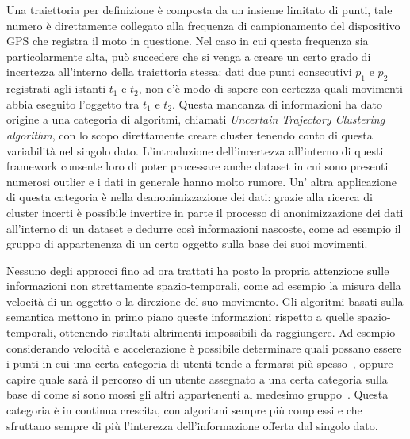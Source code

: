 Una traiettoria per definizione è composta da un insieme limitato di punti, tale numero
è direttamente collegato alla frequenza di campionamento del dispositivo GPS che registra
il moto in questione.
Nel caso in cui questa frequenza sia particolarmente alta, può succedere che si venga a creare
un certo grado di incertezza all'interno della traiettoria stessa: dati due punti consecutivi
\(p_{1}\) e \(p_{2}\) registrati agli istanti \(t_{1}\) e \(t_{2}\), non c'è modo di sapere con certezza quali
movimenti abbia eseguito l'oggetto tra  \(t_{1}\) e \(t_{2}\).
Questa mancanza di informazioni ha dato origine a una categoria di algoritmi,
chiamati \textit{Uncertain Trajectory Clustering algorithm}, con lo scopo direttamente
creare cluster tenendo conto di questa variabilità nel singolo dato.
L'introduzione dell'incertezza all'interno di questi framework consente loro di poter
processare anche dataset in cui sono presenti numerosi outlier e i dati in generale
hanno molto rumore.
Un' altra applicazione di questa categoria è nella deanonimizzazione dei dati: grazie
alla ricerca di cluster incerti è possibile invertire in parte il processo di anonimizzazione
dei dati all'interno di un dataset e dedurre così informazioni nascoste, come
ad esempio il gruppo di appartenenza di un certo oggetto sulla base dei suoi movimenti.

Nessuno degli approcci fino ad ora trattati ha posto la propria attenzione sulle informazioni non
strettamente spazio-temporali, come ad esempio la misura della velocità di un oggetto
o la direzione del suo movimento.
Gli algoritmi basati sulla semantica mettono in primo piano queste informazioni rispetto a quelle
spazio-temporali, ottenendo risultati altrimenti impossibili da raggiungere.
Ad esempio considerando velocità e accelerazione è possibile determinare quali possano
essere i punti in cui una certa categoria di utenti tende a fermarsi più spesso~\cite{zheng2008understanding},
oppure capire quale sarà il percorso di un utente assegnato a una certa categoria sulla base
di come si sono mossi gli altri appartenenti al medesimo gruppo~\cite{ying2011semantic}.
Questa categoria è in continua crescita, con algoritmi sempre più complessi e che sfruttano sempre di
più l'interezza dell'informazione offerta dal singolo dato.







